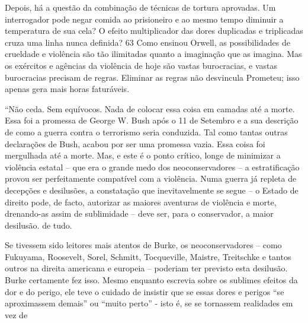 Depois, há a questão da combinação de técnicas de tortura aprovadas. Um interrogador pode negar comida ao prisioneiro e ao mesmo tempo diminuir a temperatura de sua cela? O efeito multiplicador das dores duplicadas e triplicadas cruza uma linha nunca definida? {\color{blue}63} Como ensinou Orwell, as possibilidades de crueldade e violência são tão ilimitadas quanto a imaginação que as imagina. Mas os exércitos e agências da violência de hoje são vastas burocracias, e vastas burocracias precisam de regras. Eliminar as regras não desvincula Prometeu; isso apenas gera mais horas faturáveis.
 \par 
“Não ceda. Sem equívocos. Nada de colocar essa coisa em camadas até a morte. Essa foi a promessa de George W. Bush após o {\color{blue}11} de Setembro e a sua descrição de como a guerra contra o terrorismo seria conduzida. Tal como tantas outras declarações de Bush, acabou por ser uma promessa vazia. Essa coisa foi mergulhada até a morte. Mas, e este é o ponto crítico, longe de minimizar a violência estatal – que era o grande medo dos neoconservadores – a estratificação provou ser perfeitamente compatível com a violência. Numa guerra já repleta de decepções e desilusões, a constatação que inevitavelmente se segue – o Estado de direito pode, de facto, autorizar as maiores aventuras de violência e morte, drenando-as assim de sublimidade – deve ser, para o conservador, a maior desilusão. de tudo.
 \par 
Se tivessem sido leitores mais atentos de Burke, os neoconservadores – como Fukuyama, Roosevelt, Sorel, Schmitt, Tocqueville, Maistre, Treitschke e tantos outros na direita americana e europeia – poderiam ter previsto esta desilusão. Burke certamente fez isso. Mesmo enquanto escrevia sobre os sublimes efeitos da dor e do perigo, ele teve o cuidado de insistir que se essas dores e perigos “se aproximassem demais” ou “muito perto” - isto é, se se tornassem realidades em vez de
 \par 
